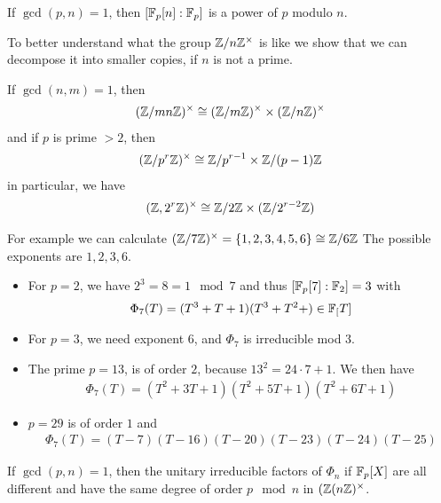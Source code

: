 
\begin{cor}[]
  If $\gcd(p,n) = 1$, then $[\mathbb{F}_p[n]:\mathbb{F}_p]$ is a power of $p$ modulo $n$.
\end{cor}
To better understand what the group $\mathbb{Z}/n\mathbb{Z}^{\times}$ is like we show that we can decompose it into smaller copies, if $n$ is not a prime.

\begin{thm}[]
  If $\gcd(n,m) = 1$, then
  \begin{align*}
    (\mathbb{Z}/mn\mathbb{Z})^{\times} \cong (\mathbb{Z}/m\mathbb{Z})^{\times} \times (\mathbb{Z}/n\mathbb{Z})^{\times}
  \end{align*}
  and if $p$ is prime $> 2$, then
  \begin{align*}
    (\mathbb{Z}/p^{r}\mathbb{Z})^{\times} \cong \mathbb{Z}/p^{r-1} \times \mathbb{Z}/(p-1)\mathbb{Z}
  \end{align*}
  in particular, we have
  \begin{align*}
    (\mathbb{Z},2^{r}\mathbb{Z})^{\times} \cong \mathbb{Z}/2\mathbb{Z} \times (\mathbb{Z}/2^{r-2}\mathbb{Z})
  \end{align*}
\end{thm}

For example we can calculate
$(\mathbb{Z}/7\mathbb{Z})^{\times} = \{1,2,3,4,5,6\} \cong \mathbb{Z}/6\mathbb{Z}$
The possible exponents are $1,2,3,6$.
\begin{itemize}
  \item For $p = 2$, we have $2^{3} = 8 = 1 \mod 7$ and thus $[\mathbb{F}_p[7]:\mathbb{F}_2]= 3$ with 
    \begin{align*}
      \Phi_7(T) = (T^{3} + T + 1)(T^{3} + T^{2} + ) \in \mathbb{F}_[T]
    \end{align*}
  \item For $p = 3$, we need exponent $6$, and $\Phi_7$ is irreducible mod $3$.
  \item The prime $p = 13$, is of order $2$, because $13^{2} = 24 \cdot 7 + 1$. We then have
    \begin{align*}
      \Phi_7(T) = (T^{2} + 3T + 1)(T^{2} + 5T + 1)(T^{2} + 6T + 1)
    \end{align*}
  \item $p = 29$ is of order $1$ and
    \begin{align*}
      \Phi_7(T) = (T-7) (T-16)(T-20)(T-23)(T-24)(T-25)
    \end{align*}
\end{itemize}


\begin{thm}[]
  If $\gcd(p,n) = 1$, then the unitary irreducible factors of $\Phi_n$ if $\mathbb{F}_p[X]$ are all different and have the same degree of order $p \mod n$ in $(\mathbb{Z}(n\mathbb{Z})^{\times}$.
\end{thm}

